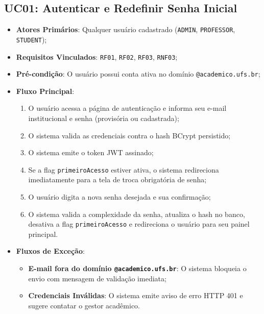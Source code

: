 \subsection{UC01: Autenticar e Redefinir Senha Inicial}
\label{sub_uc01}
\begin{itemize}
    \item \textbf{Atores Primários}: Qualquer usuário cadastrado (\texttt{ADMIN}, \texttt{PROFESSOR}, \texttt{STUDENT});
    \item \textbf{Requisitos Vinculados}: \texttt{RF01}, \texttt{RF02}, \texttt{RF03}, \texttt{RNF03};
    \item \textbf{Pré-condição}: O usuário possui conta ativa no domínio \texttt{@academico.ufs.br};
    \item \textbf{Fluxo Principal}:
    \begin{enumerate}
        \item O usuário acessa a página de autenticação e informa seu e-mail institucional e senha (provisória ou cadastrada);
        \item O sistema valida as credenciais contra o hash BCrypt persistido;
        \item O sistema emite o token JWT assinado;
        \item Se a flag \texttt{primeiroAcesso} estiver ativa, o sistema redireciona imediatamente para a tela de troca obrigatória de senha;
        \item O usuário digita a nova senha desejada e sua confirmação;
        \item O sistema valida a complexidade da senha, atualiza o hash no banco, desativa a flag \texttt{primeiroAcesso} e redireciona o usuário para seu painel principal.
    \end{enumerate}
    \item \textbf{Fluxos de Exceção}:
    \begin{itemize}
        \item \textbf{E-mail fora do domínio \texttt{@academico.ufs.br}}: O sistema bloqueia o envio com mensagem de validação imediata;
        \item \textbf{Credenciais Inválidas}: O sistema emite aviso de erro HTTP 401 e sugere contatar o gestor acadêmico.
    \end{itemize}
\end{itemize}

